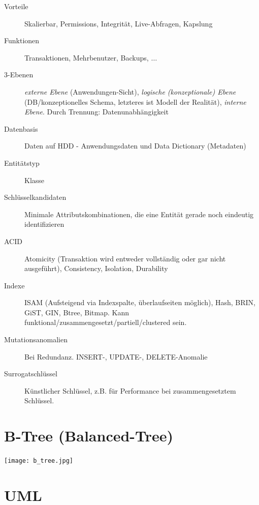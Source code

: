 \begin{multicols*}{3}
\begin{description}
    \item[Vorteile]{Skalierbar, Permissions, Integrität, Live-Abfragen, Kapslung}
    \item[Funktionen]{Transaktionen, Mehrbenutzer, Backups, $\ldots$}
    \item[3-Ebenen]{\emph{externe Ebene} (Anwendungen-Sicht), \emph{logische (konzeptionale) Ebene}
        (DB/konzeptionelles Schema, letzteres ist Modell der Realität), \emph{interne
            Ebene}. Durch Trennung: Datenunabhängigkeit}
    \item[Datenbasis]{Daten auf HDD - Anwendungsdaten und Data Dictionary (Metadaten)}
    \item[Entitätstyp]{Klasse}
    \item[Schlüsselkandidaten]{Minimale Attributskombinationen, die eine Entität
        gerade noch eindeutig identifizieren}
    \item[ACID]{Atomicity (Transaktion wird entweder vollständig oder gar nicht ausgeführt), Consistency, Isolation, Durability}
    \item[Indexe]{ISAM (Aufsteigend via Indexspalte, überlaufseiten möglich), Hash, BRIN, GiST, GIN, Btree, Bitmap. Kann funktional/zusammengesetzt/partiell/clustered sein.}
    \item[Mutationsanomalien]{Bei Redundanz. INSERT-, UPDATE-, DELETE-Anomalie}
    \item[Surrogatschlüssel]{Künstlicher Schlüssel, z.B. für Performance bei
        zusammengesetztem Schlüssel}.
\end{description}

\section{B-Tree (Balanced-Tree)}

\texttt{[image: b\_tree.jpg]}

\section{UML}


\end{multicols*}
